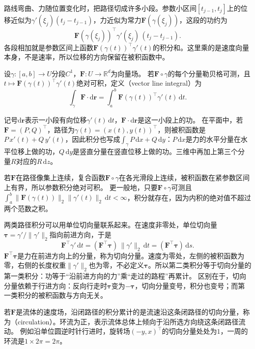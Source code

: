 路线弯曲、力随位置变化时，把路径切成许多小段。参数小区间$[t_{j-1},t_j]$上的位移近似为$\gamma'(\xi_j)(t_j-t_{j-1})$，力近似为常力$\bm F(\gamma(\xi_j))$，这段的功约为
\[
 \bm F(\gamma(\xi_j))^\top\gamma'(\xi_j)\,(t_j-t_{j-1}).
\]
各段相加就是参数区间上函数$\bm F(\gamma(t))^\top\gamma'(t)$的积分和。这里乘的是速度向量本身，不是速率，所以位移的方向保留在被积函数中。
\begin{definition}[第二类路径积分]
设$\gamma:[a,b]\to U$分段$C^1$，$\bm F:U\to\mathbb R^d$为向量场。
若$\bm F\circ\gamma$的每个分量勒贝格可测，且$t\mapsto\bm F(\gamma(t))^\top\gamma'(t)$绝对可积，定义（vector line integral）为
\begin{equation}
 \int_\gamma\bm F\mathbin{\cdot}\mathrm d\bm r
 =\int_a^b\bm F(\gamma(t))^\top\gamma'(t)\,\mathrm dt.
 \label{eq:analysis-vector-line-integral}
\end{equation}
\end{definition}

记号$\mathrm d\bm r$表示一小段有向位移$\gamma'(t)\,\mathrm dt$，$\bm F\cdot\mathrm d\bm r$是这一小段上的功。
在平面中，若$\bm F=(P,Q)^\top$，路径为$\gamma(t)=(x(t),y(t))^\top$，则被积函数是$P\,x'(t)+Q\,y'(t)$，因此积分也写成$\int_\gamma P\,\mathrm dx+Q\,\mathrm dy$：$P\,\mathrm dx$是力的水平分量在水平位移上做的功，$Q\,\mathrm dy$是竖直分量在竖直位移上做的功。三维中再加上第三个分量$R$对应的$R\,\mathrm dz$。

若$\bm F$在路径像集上连续，复合函数$\bm F\circ\gamma$在各光滑段上连续，被积函数在紧参数区间上有界，所以参数积分绝对可积。
更一般地，只要$\bm F\circ\gamma$可测且$\int_a^b\lVert\bm F(\gamma(t))\rVert_2\lVert\gamma'(t)\rVert_2\,\mathrm dt<\infty$，积分就存在，因为内积的绝对值不超过两个范数之积。

两类路径积分可以用单位切向量联系起来。在速度非零处，单位切向量$\bm\tau=\gamma'/\lVert\gamma'\rVert_2$指向前进方向，于是
\[
 \bm F^\top\gamma'\,\mathrm dt=(\bm F^\top\bm\tau)\,\lVert\gamma'\rVert_2\,\mathrm dt=(\bm F^\top\bm\tau)\,\mathrm ds.
\]
$\bm F^\top\bm\tau$是力在前进方向上的分量，称为切向分量。速度为零处，左侧的被积函数为零，右侧的长度权重$\lVert\gamma'\rVert_2$也为零，不必定义$\bm\tau$。所以第二类积分等于切向分量的第一类积分：功等于“沿前进方向的力”乘“走过的路程”再累计。
区别在于，切向分量依赖于行进方向：反向行走时$\bm\tau$变为$-\bm\tau$，切向分量变号，积分也变号；而第一类积分的被积函数与方向无关。

若$\bm F$是流体的速度场，沿闭路径的积分累计的是流速沿这条闭路径的切向分量，称为（circulation）。环流为正，表示流体总体上倾向于沿所选方向绕这条闭路径流动。
例如沿单位圆逆时针行进时，旋转场$(-y,x)^\top$的切向分量处处为$1$，一周的环流是$1\times2\pi=2\pi$。

